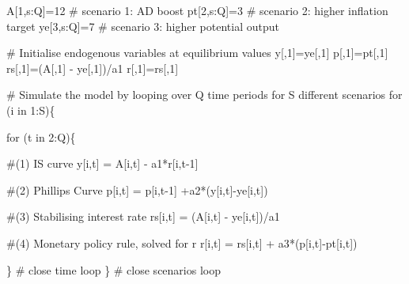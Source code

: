 \documentclass[
  letterpaper,
  DIV=11,
  numbers=noendperiod]{scrreprt}
\newenvironment{Shaded}{\begin{snugshade}}{\end{snugshade}}
\newcommand{\CommentTok}[1]{\textcolor[rgb]{0.37,0.37,0.37}{#1}}
\newcommand{\ControlFlowTok}[1]{\textcolor[rgb]{0.00,0.23,0.31}{#1}}
\newcommand{\DecValTok}[1]{\textcolor[rgb]{0.68,0.00,0.00}{#1}}
\newcommand{\NormalTok}[1]{\textcolor[rgb]{0.00,0.23,0.31}{#1}}
\newcommand{\OtherTok}[1]{\textcolor[rgb]{0.00,0.23,0.31}{#1}}
\newcommand{\SpecialCharTok}[1]{\textcolor[rgb]{0.37,0.37,0.37}{#1}}
\begin{document}
\begin{Shaded}
\begin{Highlighting}[]
\NormalTok{A[}\DecValTok{1}\NormalTok{,s}\SpecialCharTok{:}\NormalTok{Q]}\OtherTok{=}\DecValTok{12}  \CommentTok{\# scenario 1: AD boost  }
\NormalTok{pt[}\DecValTok{2}\NormalTok{,s}\SpecialCharTok{:}\NormalTok{Q]}\OtherTok{=}\DecValTok{3}  \CommentTok{\# scenario 2: higher inflation target}
\NormalTok{ye[}\DecValTok{3}\NormalTok{,s}\SpecialCharTok{:}\NormalTok{Q]}\OtherTok{=}\DecValTok{7}  \CommentTok{\# scenario 3: higher potential output}

\CommentTok{\# Initialise endogenous variables at equilibrium values}
\NormalTok{y[,}\DecValTok{1}\NormalTok{]}\OtherTok{=}\NormalTok{ye[,}\DecValTok{1}\NormalTok{]}
\NormalTok{p[,}\DecValTok{1}\NormalTok{]}\OtherTok{=}\NormalTok{pt[,}\DecValTok{1}\NormalTok{]}
\NormalTok{rs[,}\DecValTok{1}\NormalTok{]}\OtherTok{=}\NormalTok{(A[,}\DecValTok{1}\NormalTok{] }\SpecialCharTok{{-}}\NormalTok{ ye[,}\DecValTok{1}\NormalTok{])}\SpecialCharTok{/}\NormalTok{a1 }
\NormalTok{r[,}\DecValTok{1}\NormalTok{]}\OtherTok{=}\NormalTok{rs[,}\DecValTok{1}\NormalTok{]}

\CommentTok{\# Simulate the model by looping over Q time periods for S different scenarios}
\ControlFlowTok{for}\NormalTok{ (i }\ControlFlowTok{in} \DecValTok{1}\SpecialCharTok{:}\NormalTok{S)\{}
  
  \ControlFlowTok{for}\NormalTok{ (t }\ControlFlowTok{in} \DecValTok{2}\SpecialCharTok{:}\NormalTok{Q)\{}
    
    \CommentTok{\#(1) IS curve}
\NormalTok{    y[i,t] }\OtherTok{=}\NormalTok{ A[i,t] }\SpecialCharTok{{-}}\NormalTok{ a1}\SpecialCharTok{*}\NormalTok{r[i,t}\DecValTok{{-}1}\NormalTok{]}
    
    \CommentTok{\#(2) Phillips Curve}
\NormalTok{    p[i,t] }\OtherTok{=}\NormalTok{ p[i,t}\DecValTok{{-}1}\NormalTok{] }\SpecialCharTok{+}\NormalTok{a2}\SpecialCharTok{*}\NormalTok{(y[i,t]}\SpecialCharTok{{-}}\NormalTok{ye[i,t])}
    
    \CommentTok{\#(3) Stabilising interest rate}
\NormalTok{    rs[i,t] }\OtherTok{=}\NormalTok{ (A[i,t] }\SpecialCharTok{{-}}\NormalTok{ ye[i,t])}\SpecialCharTok{/}\NormalTok{a1}
    
    \CommentTok{\#(4) Monetary policy rule, solved for r}
\NormalTok{    r[i,t] }\OtherTok{=}\NormalTok{ rs[i,t] }\SpecialCharTok{+}\NormalTok{ a3}\SpecialCharTok{*}\NormalTok{(p[i,t]}\SpecialCharTok{{-}}\NormalTok{pt[i,t])}
  
\NormalTok{  \} }\CommentTok{\# close time loop}
\NormalTok{\}   }\CommentTok{\# close scenarios loop}
\end{Highlighting}
\end{Shaded}
\end{document}
